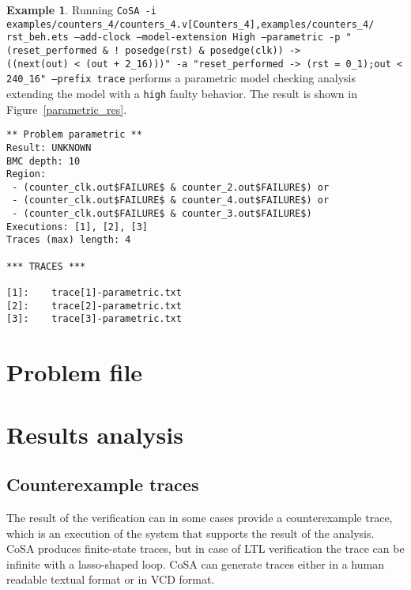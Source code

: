 \documentclass{article}
\theoremstyle{definition}
\newtheorem{example}{Example}[section]
\begin{document}
\begin{example}

  Running \texttt{CoSA -i
    examples/counters\_4/counters\_4.v[Counters\_4],examples/counters\_4/
    rst\_beh.ets
    --add-clock --model-extension High --parametric -p
    "(reset\_performed \& ! posedge(rst) \& posedge(clk)) ->\\
    ((next(out) < (out + 2\_16)))" -a "reset\_performed -> (rst =
    0\_1);out < 240\_16" --prefix trace} performs a parametric
  model checking analysis extending the model with a \texttt{high}
  faulty behavior. The result is shown in
  Figure~\ref{parametric_res}.

\begin{lstlisting}[frame=single,language=ets,caption=Parametric analysis example,label=parametric_res]
** Problem parametric **
Result: UNKNOWN
BMC depth: 10
Region:
 - (counter_clk.out$FAILURE$ & counter_2.out$FAILURE$) or 
 - (counter_clk.out$FAILURE$ & counter_4.out$FAILURE$) or 
 - (counter_clk.out$FAILURE$ & counter_3.out$FAILURE$)
Executions: [1], [2], [3]
Traces (max) length: 4

*** TRACES ***

[1]:	trace[1]-parametric.txt
[2]:	trace[2]-parametric.txt
[3]:	trace[3]-parametric.txt
\end{lstlisting}

\end{example}


\section{Problem file}
\label{sec:problem_file}


\section{Results analysis}
\label{sec:results_analysis}

\subsection{Counterexample traces}

The result of the verification can in some cases provide a
counterexample trace, which is an execution of the system that
supports the result of the analysis. CoSA produces finite-state
traces, but in case of LTL verification the trace can be infinite with
a lasso-shaped loop. CoSA can generate traces either in a human
readable textual format or in VCD format.
\end{document}
